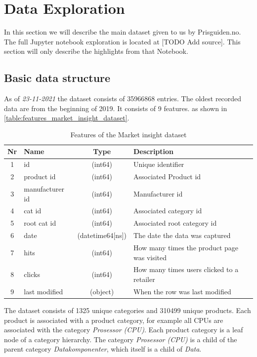 \section{Data Exploration}
\label{section:Architecture:DataExploration}
In this section we will describe the main dataset given to us 
by Prisguiden.no. The full Jupyter notebook exploration
is located at [TODO Add source]. This section will only
describe the highlights from that Notebook.

\subsection{Basic data structure}
As of \textit{23-11-2021} the dataset consists of 35966868 entries.
The oldest recorded data are from the beginning of 2019.
It consists of 9 features.
as shown in \autoref{table:features_market_insight_dataset}.
\begin{table}[htbp]
  \centering
  \caption{Features of the Market insight dataset}
  \label{table:features_market_insight_dataset}
  \begin{tabular}{|c|l|c|l|}\hline\hline
   Nr & Name & Type & Description \\ \hline 
   1 &id &(int64) & Unique identifier \\ \hline
  2 & product id & (int64) & Associated Product id \\ \hline
  3 & manufacturer id & (int64) & Manufacturer id \\ \hline
  4 &cat id & (int64) & Associated category id \\ \hline
  5 & root cat id & (int64) & Associated root category id \\ \hline
  6 & date & (datetime64[ns]) & The date the data was captured \\ \hline
  7 & hits & (int64) & How many times the product page was visited \\ \hline
  8 &clicks & (int64) & How many times users clicked to a retailer \\ \hline
  9 & last modified & (object) & When the row was last modified \\ \hline
  \end{tabular}
\end{table}

The dataset consists of 1325 unique categories and 310499 unique products.
Each product is associated with a product category, for example
all CPUs are associated with the category
\textit{Prosessor (CPU)}.
Each product category is a leaf node of a category hierarchy.
The category \textit{Prosessor (CPU)} is a child of the parent category 
\textit{Datakomponenter}, which itself is a child of \textit{Data}.

